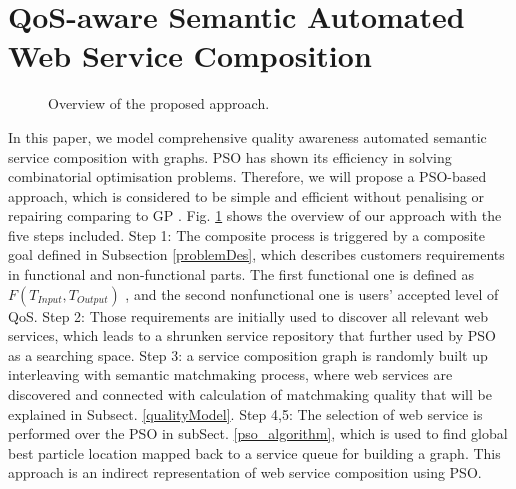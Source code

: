 \documentclass{llncs}
\begin{document}
\section{QoS-aware Semantic Automated Web Service Composition}\label{qswsc_approach}
\begin{figure}[h]
\centerline{
}
 \caption{Overview of the proposed approach.}
 \label{overview}
\end{figure}
In this paper, we model comprehensive quality awareness automated semantic service composition with graphs. PSO has shown its efficiency in solving combinatorial optimisation problems. Therefore, we will propose a PSO-based approach, which is considered to be simple and efficient without penalising or repairing comparing to GP \cite{da2014graph}. Fig. \ref{overview} shows the overview of our approach with the five steps included. Step 1: The composite process is triggered by a composite goal defined in Subsection \ref{problemDes}, which describes customers requirements in functional and non-functional parts. The first functional one is defined as $F(T_{Input}, T_{Output})$ , and the second nonfunctional one is users' accepted level of QoS. Step 2: Those requirements are initially used to discover all relevant web services, which leads to a shrunken service repository that further used by PSO as a searching space. Step 3: a service composition graph is randomly built up interleaving with semantic matchmaking process, where web services are discovered and connected with calculation of matchmaking quality that will be explained in Subsect. \ref{qualityModel}. Step 4,5: The selection of web service is performed over the PSO in subSect. \ref{pso_algorithm}, which is used to find global best particle location mapped back to a service queue for building a graph. This approach \cite{da2016particle} is an indirect representation of web service composition using PSO.
\end{document}
